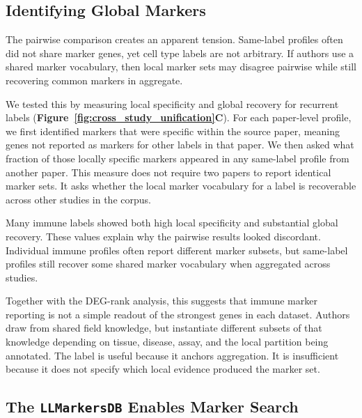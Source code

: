 \documentclass[10pt,twocolumn]{article}
\theoremstyle{plain}
\theoremstyle{definition}
\theoremstyle{remark}
\begin{document}
\subsection*{Identifying Global Markers}
The pairwise comparison creates an apparent tension. Same-label profiles often did not share marker genes, yet cell type labels are not arbitrary. If authors use a shared marker vocabulary, then local marker sets may disagree pairwise while still recovering common markers in aggregate.

We tested this by measuring local specificity and global recovery for recurrent labels (\textbf{Figure~\ref{fig:cross_study_unification}C}). For each paper-level profile, we first identified markers that were specific within the source paper, meaning genes not reported as markers for other labels in that paper. We then asked what fraction of those locally specific markers appeared in any same-label profile from another paper. This measure does not require two papers to report identical marker sets. It asks whether the local marker vocabulary for a label is recoverable across other studies in the corpus.

Many immune labels showed both high local specificity and substantial global recovery.  These values explain why the pairwise results looked discordant. Individual immune profiles often report different marker subsets, but same-label profiles still recover some shared marker vocabulary when aggregated across studies.

Together with the DEG-rank analysis, this suggests that immune marker reporting is not a simple readout of the strongest genes in each dataset. Authors draw from shared field knowledge, but instantiate different subsets of that knowledge depending on tissue, disease, assay, and the local partition being annotated. The label is useful because it anchors aggregation. It is insufficient because it does not specify which local evidence produced the marker set.

\subsection*{The \texttt{LLMarkersDB} Enables Marker Search}
\end{document}

